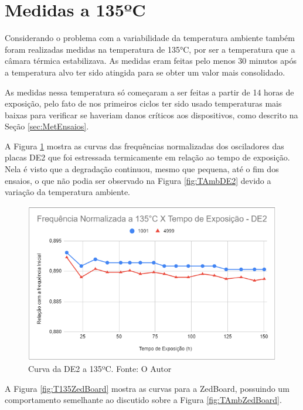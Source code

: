 \section{Medidas a 135ºC}
\label{sec:ResT135}

Considerando o problema com a variabilidade da temperatura ambiente também foram realizadas medidas na temperatura de 135°C, por ser a temperatura que a câmara térmica estabilizava. As medidas eram feitas pelo menos 30 minutos após a temperatura alvo ter sido atingida para se obter um valor mais consolidado.

As medidas nessa temperatura só começaram a ser feitas a partir de 14 horas de exposição, pelo fato de nos primeiros ciclos ter sido usado temperaturas mais baixas para verificar se haveriam danos críticos aos dispositivos, como descrito na Seção \ref{sec:MetEnsaios}.

A Figura \ref{fig:T135DE2} mostra as curvas das frequências normalizadas dos osciladores das placas  DE2 que foi estressada termicamente em relação ao tempo de exposição. Nela é visto que a degradação continuou, mesmo que pequena, até o fim dos ensaios, o que não podia ser observado na Figura \ref{fig:TAmbDE2} devido a variação da temperatura ambiente.

\begin{figure}[H]
    \centering
    \includegraphics[scale=0.75]{figures/Resultados/T135DE2}
    \caption{Curva da DE2 a 135ºC. Fonte: O Autor}
    \label{fig:T135DE2}
\end{figure}

A Figura \ref{fig:T135ZedBoard} mostra as curvas para a ZedBoard, possuindo um comportamento semelhante ao discutido sobre a Figura \ref{fig:TAmbZedBoard}.

